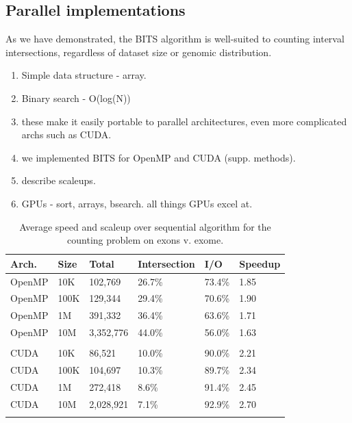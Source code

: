\documentclass{bioinfo}
\begin{document}
	\subsection{Parallel implementations}
	
	As we have demonstrated, the BITS algorithm is well-suited to counting
	interval intersections, regardless of dataset size or genomic distribution.
	
	\begin{enumerate}
		\item Simple data structure - array.
		\item Binary search - O(log(N))
		\item these make it easily portable to parallel architectures, even 
		      more complicated archs such as CUDA.
		\item we implemented BITS for OpenMP and CUDA (supp. methods).
		\item describe scaleups.
		\item GPUs - sort, arrays, bsearch.  all things GPUs excel at.
	\end{enumerate}	
	
	\begin{table}[h]
	\centering
	\begin{center}
		\begin{tabular}{l l l l l l}
			Arch. & Size & Total & Intersection & I/O & Speedup \\
			\hline
			\hline
			OpenMP & 10K & 102,769 & 26.7\% & 73.4\% & 1.85 \\
			OpenMP & 100K & 129,344 & 29.4\% & 70.6\% & 1.90 \\
			OpenMP & 1M & 391,332 & 36.4\% & 63.6\% & 1.71 \\
			OpenMP & 10M & 3,352,776 & 44.0\% & 56.0\% & 1.63 \\ 
			\\
			CUDA & 10K & 86,521 & 10.0\% & 90.0\% & 2.21 \\
			CUDA & 100K & 104,697 & 10.3\% & 89.7\% & 2.34 \\
			CUDA & 1M & 272,418 & 8.6\% & 91.4\% & 2.45 \\
			CUDA & 10M & 2,028,921 & 7.1\% & 92.9\% & 2.70 \\
			\\
		\end{tabular}
	\end{center}
	\label{table:avge}
	\caption{Average speed and scaleup over sequential algorithm for the counting problem on exons v. exome.}
	\end{table}
	
\end{document}
